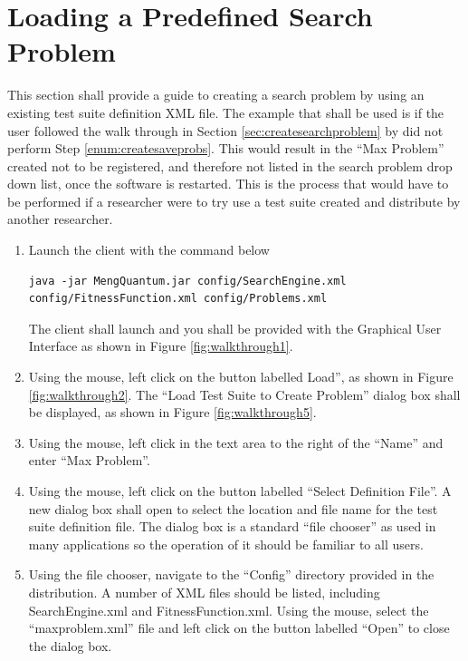 \section{Loading a Predefined Search Problem}
This section shall provide a guide to creating a search problem by using an existing test suite definition XML file.
The example that shall be used is if the user followed the walk through in Section \ref{sec:createsearchproblem} by did not perform Step \ref{enum:createsaveprobs}.
This would result in the ``Max Problem'' created not to be registered, and therefore not listed in the search problem drop down list, once the software is restarted.
This is the process that would have to be performed if a researcher were to try use a test suite created and distribute by another researcher.

\begin{enumerate}
 \item Launch the client with the command below
\begin{lstlisting}
java -jar MengQuantum.jar config/SearchEngine.xml config/FitnessFunction.xml config/Problems.xml
\end{lstlisting}
The client shall launch and you shall be provided with the Graphical User Interface as shown in Figure \ref{fig:walkthrough1}.

\item Using the mouse, left click on the button labelled Load'', as shown in Figure \ref{fig:walkthrough2}.
The ``Load Test Suite to Create Problem'' dialog box shall be displayed, as shown in Figure \ref{fig:walkthrough5}.

\item Using the mouse, left click in the text area to the right of the ``Name'' and enter ``Max Problem''.

\item Using the mouse, left click on the button labelled ``Select Definition File''.
A new dialog box shall open to select the location and file name for the test suite definition file.
The dialog box is a standard ``file chooser'' as used in many applications so the operation of it should be familiar to all users.

\item Using the file chooser, navigate to the ``Config'' directory provided in the distribution.
A number of XML files should be listed, including SearchEngine.xml and FitnessFunction.xml.
Using the mouse, select the ``maxproblem.xml'' file and left click on the button labelled ``Open'' to close the dialog box.


\end{enumerate}

